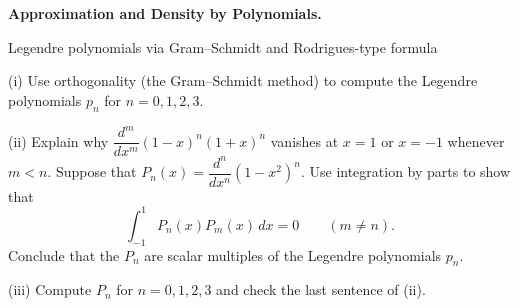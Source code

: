 \begin{problem}[CP-II-0057]
\label{prob:cp-ii-0057}
\textbf{Approximation and Density by Polynomials.}

\hspace*{1.5em}Legendre polynomials via Gram--Schmidt and Rodrigues-type formula

(i) Use orthogonality (the Gram--Schmidt method) to compute the Legendre polynomials $p_n$ for $n=0,1,2,3$.
\par (ii) Explain why $\dfrac{d^m}{dx^m}(1-x)^n(1+x)^n$ vanishes at $x=1$ or $x=-1$ whenever $m<n$.
Suppose that $P_n(x)=\dfrac{d^n}{dx^n}(1-x^2)^n$. Use integration by parts to show that
\[
\int_{-1}^{1} P_n(x)P_m(x)\,dx=0\qquad(m\ne n).
\]
Conclude that the $P_n$ are scalar multiples of the Legendre polynomials $p_n$.
\par (iii) Compute $P_n$ for $n=0,1,2,3$ and check the last sentence of (ii).
\end{problem}

